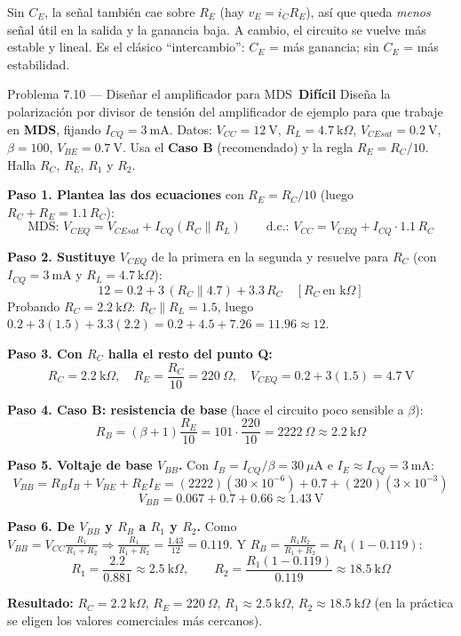 \documentclass[11pt,a4paper]{article}
\newcommand{\dificil}{\textcolor{rojoAlerta}{\faIcon{circle}\,\textbf{Difícil}}}
\begin{document}
\begin{porqueBox}
Sin $C_E$, la señal también cae sobre $R_E$ (hay $v_E=i_C R_E$), así que queda \emph{menos} señal útil en la salida y la ganancia baja. A cambio, el circuito se vuelve más estable y lineal. Es el clásico ``intercambio'': $C_E$ = más ganancia; sin $C_E$ = más estabilidad.
\end{porqueBox}

\begin{problemaBox}{Problema 7.10 --- Diseñar el amplificador para MDS \quad \dificil}
Diseña la polarización por divisor de tensión del amplificador de ejemplo para que trabaje en \textbf{MDS}, fijando $I_{CQ}=3\ \text{mA}$. Datos: $V_{CC}=12\ \text{V}$, $R_L=4.7\ \text{k}\Omega$, $V_{CEsat}=0.2\ \text{V}$, $\beta=100$, $V_{BE}=0.7\ \text{V}$. Usa el \textbf{Caso B} (recomendado) y la regla $R_E=R_C/10$. Halla $R_C$, $R_E$, $R_1$ y $R_2$.
\end{problemaBox}

\begin{solucionBox}
\textbf{Paso 1. Plantea las dos ecuaciones} con $R_E=R_C/10$ (luego $R_C+R_E=1.1\,R_C$):
\[
\text{MDS: } V_{CEQ}=V_{CEsat}+I_{CQ}(R_C\parallel R_L)\qquad
\text{d.c.: } V_{CC}=V_{CEQ}+I_{CQ}\cdot 1.1\,R_C
\]

\textbf{Paso 2. Sustituye $V_{CEQ}$} de la primera en la segunda y resuelve para $R_C$ (con $I_{CQ}=3\ \text{mA}$ y $R_L=4.7\ \text{k}\Omega$):
\[
12=0.2+3\,(R_C\parallel 4.7)+3.3\,R_C\quad[R_C\ \text{en k}\Omega]
\]
Probando $R_C=2.2\ \text{k}\Omega$: $R_C\parallel R_L=1.5$, luego $0.2+3(1.5)+3.3(2.2)=0.2+4.5+7.26=11.96\approx12$. \ \checkmark

\textbf{Paso 3. Con $R_C$ halla el resto del punto Q:}
\[
R_C=2.2\ \text{k}\Omega,\quad R_E=\frac{R_C}{10}=220\ \Omega,\quad V_{CEQ}=0.2+3(1.5)=4.7\ \text{V}
\]

\textbf{Paso 4. Caso B: resistencia de base} (hace el circuito poco sensible a $\beta$):
\[
R_B=(\beta+1)\frac{R_E}{10}=101\cdot\frac{220}{10}=2222\ \Omega\approx 2.2\ \text{k}\Omega
\]

\textbf{Paso 5. Voltaje de base $V_{BB}$.} Con $I_B=I_{CQ}/\beta=30\ \mu\text{A}$ e $I_E\approx I_{CQ}=3\ \text{mA}$:
\[
V_{BB}=R_B I_B+V_{BE}+R_E I_E=(2222)(30\times10^{-6})+0.7+(220)(3\times10^{-3})
\]
\[
V_{BB}=0.067+0.7+0.66\approx 1.43\ \text{V}
\]

\textbf{Paso 6. De $V_{BB}$ y $R_B$ a $R_1$ y $R_2$.} Como $V_{BB}=V_{CC}\frac{R_1}{R_1+R_2}\Rightarrow \frac{R_1}{R_1+R_2}=\frac{1.43}{12}=0.119$. Y $R_B=\frac{R_1R_2}{R_1+R_2}=R_1(1-0.119)$:
\[
R_1=\frac{2.2}{0.881}\approx 2.5\ \text{k}\Omega,\qquad R_2=\frac{R_1(1-0.119)}{0.119}\approx 18.5\ \text{k}\Omega
\]

\textbf{Resultado:} $R_C=2.2\ \text{k}\Omega$, $R_E=220\ \Omega$, $R_1\approx2.5\ \text{k}\Omega$, $R_2\approx18.5\ \text{k}\Omega$ (en la práctica se eligen los valores comerciales más cercanos).
\end{solucionBox}
\end{document}
